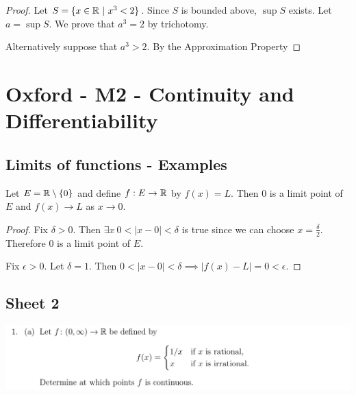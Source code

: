 \begin{enumerate}
  \begin{proof}
    Let $S = \{x \in \mathbb{R} ~|~ x^3 < 2\}$. Since $S$ is bounded above, $\sup S$ exists. Let
    $a = \sup S$. We prove that $a^3 = 2$ by trichotomy.


    Alternatively suppose that $a^3 > 2$. By the Approximation Property
  \end{proof}\end{enumerate}

\newpage
\section{Oxford - M2 - Continuity and Differentiability}

\subsection{Limits of functions - Examples}

\begin{example}
  Let $E = \mathbb{R}\setminus \{0\}$ and define $f:E \to \mathbb{R}$ by $f(x) = L$. Then 0 is a limit point of
  $E$ and $f(x) \to L$ as $x \to 0$.
\end{example}

\begin{proof}
  Fix $\delta > 0$. Then $\exists x ~ 0 < |x - 0| < \delta$ is true since we can choose
  $x = \frac{\delta}{2}$. Therefore 0 is a limit point of $E$.

  Fix $\epsilon > 0$. Let $\delta = 1$. Then
  $0 < |x - 0| < \delta \implies |f(x) - L| = 0 < \epsilon$.
\end{proof}

\newpage
\subsection{Sheet 2}

\begin{mdframed}
  \includegraphics[width=400pt]{img/oxford-prelims-M2-analysis-II-sheet-2-1a.png}
\end{mdframed}

